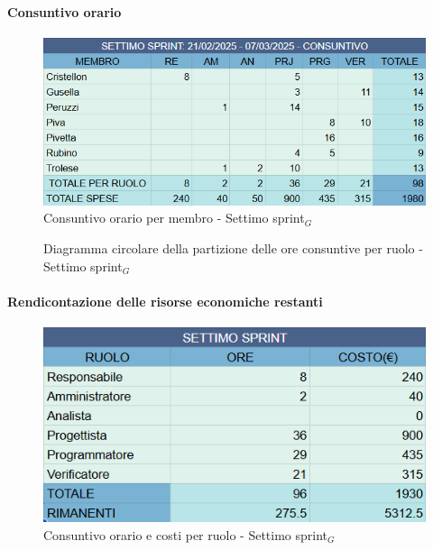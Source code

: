 \documentclass[10pt]{article}
\begin{document}
{{{{{{{{        \paragraph{Consuntivo orario}\mbox{}\vspace{0.4em}
        \begin{figure}[ht]
            \centering
            \includegraphics[width=0.6\linewidth]{consuntivoOreSettimoSprint.png}
            \caption{Consuntivo orario per membro - Settimo sprint$_G$}
            \label{fig:Consuntivo orario per membro - Settimo sprint$_G$}
        \end{figure}

        \begin{figure}[H]
            \centering
            \caption{Diagramma circolare della partizione delle ore consuntive per ruolo - Settimo sprint$_G$ }
            \label{fig:Diagramma circolare della partizione delle ore consuntive per ruolo - Settimo sprint$_G$}
        \end{figure}

        \paragraph{Rendicontazione delle risorse economiche restanti}\mbox{}\vspace{0.4em}
        \begin{figure}[H]
            \centering
            \includegraphics[width=0.6\linewidth]{oreCostiSettimoSprint.png}
            \caption{Consuntivo orario e costi per ruolo - Settimo sprint$_G$}
            \label{fig:Consuntivo orario e costi per ruolo - Settimo sprint$_G$}
        \end{figure}
        
}}}}}}}}
\end{document}
